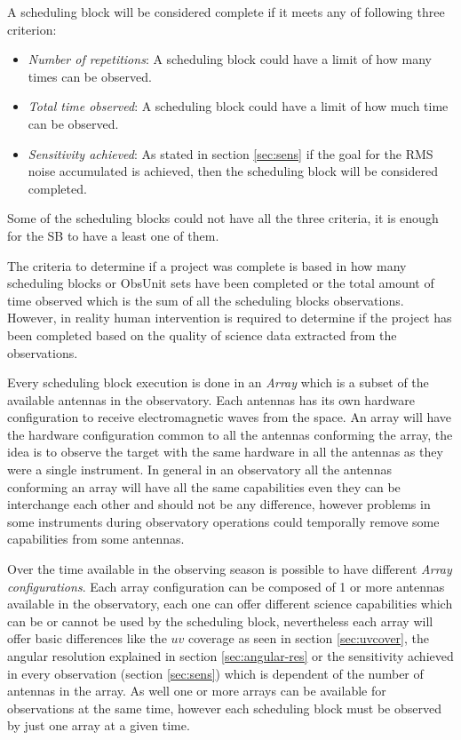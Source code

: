 \documentclass[11pt]{article}
\begin{document}
A scheduling block will be considered complete if it meets any of following three criterion:
\begin{itemize}
	\item \textit{Number of repetitions}: A scheduling block could have a limit of how many times can be observed.
	\item \textit{Total time observed}: A scheduling block could have a limit of how much time can be observed.
	\item \textit{Sensitivity achieved}: As stated in section \ref{sec:sens} if the goal for the RMS noise accumulated is achieved, then the scheduling block will be considered completed.
\end{itemize} 
Some of the scheduling blocks could not have all the three criteria, it is enough for the SB to have a least one of them.

The criteria to determine if a project was complete is based in how many scheduling blocks or ObsUnit sets have been completed or the total amount of time observed which is the sum of all the scheduling blocks observations. However, in reality human intervention is required to determine if the project has been completed based on the quality of science data extracted from the observations.

Every scheduling block execution is done in an \textit{Array} which is a subset of the available antennas in the observatory. Each antennas has its own hardware configuration to receive electromagnetic waves from the space. An array will have the hardware configuration common to all the antennas conforming the array, the idea is to observe the target with the same hardware in all the antennas as they were a single instrument. In general in an observatory all the antennas conforming an array will have all the same capabilities even they can be interchange each other and should not be any difference, however problems in some instruments during observatory operations could temporally remove some capabilities from some antennas.

Over the time available in the observing season is possible to have different \textit{Array configurations}. Each array configuration can be composed of 1 or more antennas available in the observatory, each one can offer different science capabilities which can be or cannot be used by the scheduling block, nevertheless each array will offer basic differences like the $uv$ coverage as seen in section \ref{sec:uvcover}, the angular resolution explained in section \ref{sec:angular-res} or the sensitivity achieved in every observation (section \ref{sec:sens}) which is dependent of the number of antennas in the array. As well one or more arrays can be available for observations at the same time, however each scheduling block must be observed by just one array at a given time.
\end{document}
